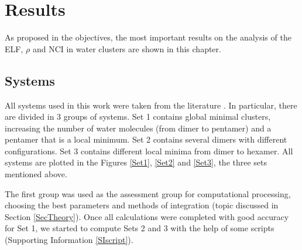 \chapter{Results}

As proposed in the objectives, the most important results
on the analysis of the ELF, $\rho$ and NCI in water clusters are
shown in this chapter.

\section{Systems}

All systems used in this work were taken from the literature
\cite{Temelso2011}. In particular, there are divided in 3 groups of systems.
Set 1 contains global minimal clusters, increasing the number of water molecules
(from dimer to pentamer) and a pentamer that is a local minimum. Set 2 contains several
dimers with different configurations. Set 3 contains different local minima
from dimer to hexamer. All systems are plotted in
the Figures \ref{Set1}, \ref{Set2} and \ref{Set3}, the three sets
mentioned above.

The first group was used as the assessment group for computational
processing, choosing the best parameters and methods of integration (topic discussed in
Section \ref{SecTheory}). Once
all calculations were completed with good accuracy for Set 1, we started to compute Sets
2 and 3 with the help of some scripts (Supporting Information \ref{SIscript}).

\newpage

